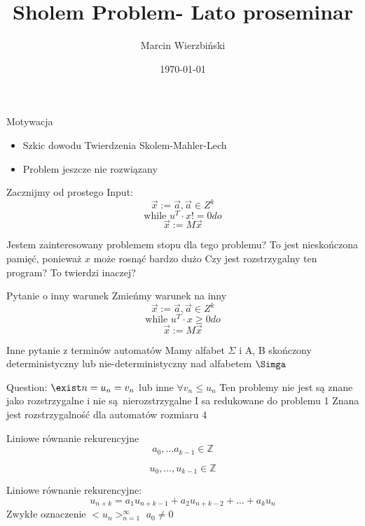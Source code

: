 \documentclass{beamer}
\title{Sholem Problem- Lato proseminar}
\author{Marcin Wierzbiński}
\institute{MIMUW}
\date{\today}
\theoremstyle{definition}
\begin{document}
\frame{\titlepage}

\begin{frame}{Motywacja}
\begin{itemize}
    \item Szkic dowodu Twierdzenia Skolem-Mahler-Lech
    \item Problem jeszcze nie rozwiązany
\end{itemize}
\end{frame}
    
\begin{frame}{Zacznijmy od prostego}
    Input: 
    $$\vec{x} := \vec{a}, \vec{a} \in Z^{k}$$
    $$\text{while } u^{T}\cdot x != 0 do$$
    $$ \vec{x} := M \vec{x}$$

    Jestem zainteresowany problemem stopu dla tego problemu? To jest nieskończona pamięć, ponieważ $x$ może rosnąć bardzo dużo
    Czy jest rozstrzygalny ten program? To twierdzi inaczej?
    
    
\end{frame}
    
\begin{frame}{Pytanie o inny warunek}
        Zmieńmy warunek na inny 
    $$\vec{x} := \vec{a}, \vec{a} \in Z^{k}$$
    $$\text{while } u^{T}\cdot x \geq  0 do$$
    $$ \vec{x} := M \vec{x}$$
    
\end{frame}    

\begin{frame}{Inne pytanie z terminów automatów}
    Mamy alfabet $\Sigma$ i A, B skończony deterministyczny lub nie-deterministyczny nad alfabetem $\Simga$

\begin{frame}{Liniowe równanie rekurencyjne}
    $$
        a_0, \ldots a_{k-1} \in \mathbb{Z} 
    $$
    
    $$
        u_0, \ldots, u_{k-1} \in \mathbb{Z}
    $$
    
    
    Liniowe równanie rekurencyjne: 
    $$
    u_{n+k}=a_{1} u_{n+k-1}+a_{2} u_{n+k-2}+\ldots+a_{k} u_{n}
    $$
    Zwykłe oznaczenie $<u_n>_{n=1}^{\infty}$
    $a_0 \neq 0$
\end{frame}
\end{document}
